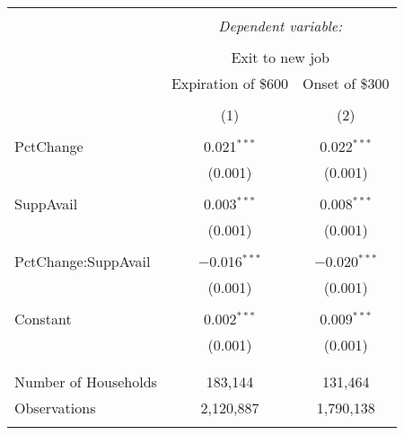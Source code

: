
\begin{tabular}{@{\extracolsep{5pt}}lcc} 
\\[-1.8ex]\toprule 
\toprule \\[-1.8ex] 
 & \multicolumn{2}{c}{\textit{Dependent variable:}} \\ 
\cmidrule{2-3} 
\\[-1.8ex] & \multicolumn{2}{c}{Exit to new job} \\ 
 & Expiration of \$600 & Onset of \$300 \\ 
\\[-1.8ex] & (1) & (2)\\ 
\midrule \\[-1.8ex] 
 PctChange & 0.021$^{***}$ & 0.022$^{***}$ \\ 
  & (0.001) & (0.001) \\ 
  & & \\ 
 SuppAvail & 0.003$^{***}$ & 0.008$^{***}$ \\ 
  & (0.001) & (0.001) \\ 
  & & \\ 
 PctChange:SuppAvail & $-$0.016$^{***}$ & $-$0.020$^{***}$ \\ 
  & (0.001) & (0.001) \\ 
  & & \\ 
 Constant & 0.002$^{***}$ & 0.009$^{***}$ \\ 
  & (0.001) & (0.001) \\ 
  & & \\ 
\midrule \\[-1.8ex] 
Number of Households & 183,144 & 131,464 \\ 
Observations & 2,120,887 & 1,790,138 \\ 
\bottomrule \\[-1.8ex] 
\end{tabular} 
